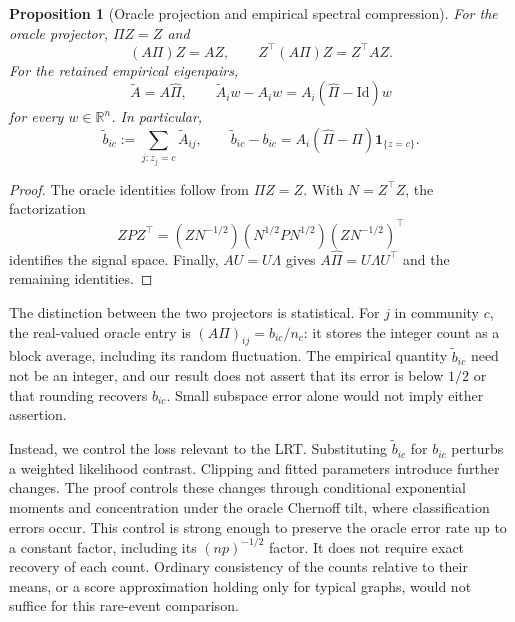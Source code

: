\documentclass[11pt]{article}
\newtheorem{proposition}[theorem]{Proposition}
\theoremstyle{definition}
\theoremstyle{remark}
\newcommand{\one}{\mathbf 1}
\numberwithin{equation}{section}
\begin{document}
\begin{proposition}[Oracle projection and empirical spectral compression]
\label{prop:exact-preservation}
For the oracle projector, $\Pi Z=Z$ and
\begin{equation}
 (A\Pi)Z=AZ,\qquad Z^\top(A\Pi)Z=Z^\top AZ.
 \label{eq:oracle-count-preservation}
\end{equation}
For the retained empirical eigenpairs,
\begin{equation}
 \widetilde A=A\widehat\Pi,\qquad
 \widetilde A_iw-A_iw=A_i(\widehat\Pi-\mathrm{Id})w
 \label{eq:projection-identity}
\end{equation}
for every $w\in\mathbb R^n$. In particular,
\begin{equation}
 \widetilde b_{ic}:=\sum_{j:z_j=c}\widetilde A_{ij},\qquad
 \widetilde b_{ic}-b_{ic}
   =A_i(\widehat\Pi-\Pi)\one_{\{z=c\}}.
 \label{eq:empirical-count-error}
\end{equation}
\end{proposition}
\begin{proof}
The oracle identities follow from $\Pi Z=Z$. With $N=Z^\top Z$, the factorization
\[
 ZPZ^\top=(ZN^{-1/2})(N^{1/2}PN^{1/2})(ZN^{-1/2})^\top
\]
identifies the signal space. Finally, $AU=U\Lambda$ gives $A\widehat\Pi=U\Lambda U^\top$ and the remaining identities.
\end{proof}

The distinction between the two projectors is statistical. For $j$ in community $c$, the real-valued oracle entry is $(A\Pi)_{ij}=b_{ic}/n_c$: it stores the integer count as a block average, including its random fluctuation. The empirical quantity $\widetilde b_{ic}$ need not be an integer, and our result does not assert that its error is below $1/2$ or that rounding recovers $b_{ic}$. Small subspace error alone would not imply either assertion.

Instead, we control the loss relevant to the LRT. Substituting $\widetilde b_{ic}$ for $b_{ic}$ perturbs a weighted likelihood contrast. Clipping and fitted parameters introduce further changes. The proof controls these changes through conditional exponential moments and concentration under the oracle Chernoff tilt, where classification errors occur. This control is strong enough to preserve the oracle error rate up to a constant factor, including its $(np)^{-1/2}$ factor. It does not require exact recovery of each count. Ordinary consistency of the counts relative to their means, or a score approximation holding only for typical graphs, would not suffice for this rare-event comparison.
\end{document}
